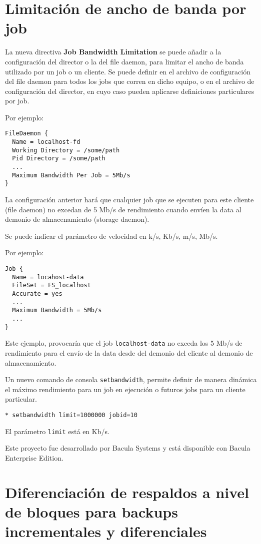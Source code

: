 \section{Limitación de ancho de banda por job}

La nueva directiva {\bf Job Bandwidth Limitation} se puede añadir a la configuración 
del director o la del file daemon, para limitar el ancho de banda utilizado por un 
job o un cliente. Se puede definir en el archivo de configuración del file daemon 
para todos los jobs que corren en dicho equipo, o en el archivo de configuración del 
director, en cuyo caso pueden aplicarse definiciones particulares por job.

Por ejemplo:
\begin{verbatim}
FileDaemon {
  Name = localhost-fd
  Working Directory = /some/path
  Pid Directory = /some/path
  ...
  Maximum Bandwidth Per Job = 5Mb/s
}
\end{verbatim}

La configuración anterior hará que cualquier job que se ejecuten para este cliente 
(file daemon) no excedan de 5 Mb/s de rendimiento cuando envíen la data al demonio 
de almacenamiento (storage daemon).

Se puede indicar el parámetro de velocidad en k/s, Kb/s, m/s, Mb/s.

Por ejemplo:
\begin{verbatim}
Job {
  Name = locahost-data
  FileSet = FS_localhost
  Accurate = yes
  ...
  Maximum Bandwidth = 5Mb/s
  ...
}
\end{verbatim}

Este ejemplo, provocaría que el job \texttt{localhost-data} no exceda los 5 Mb/s 
de rendimiento para el envío de la data desde del demonio del cliente al demonio de almacenamiento.

Un nuevo comando de consola \texttt{setbandwidth}, permite definir de manera dinámica el 
máximo rendimiento para un job en ejecución o futuros jobs para un cliente particular.

\begin{verbatim}
* setbandwidth limit=1000000 jobid=10
\end{verbatim}

El parámetro \texttt{limit} está en Kb/s.

\medskip
Este proyecto fue desarrollado por Bacula Systems y está disponible 
con Bacula Enterprise Edition.

\section{Diferenciación de respaldos a nivel de bloques para backups incrementales y diferenciales}

